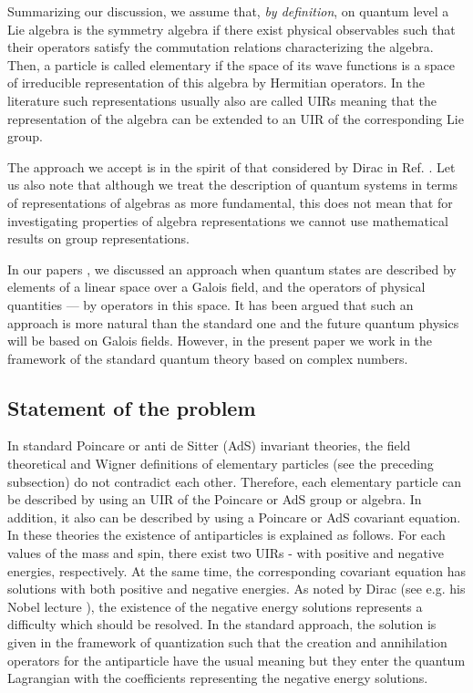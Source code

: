 \documentclass[a4paper,12pt]{article}%
\begin{document}
Summarizing our discussion, we assume that, 
{\it by definition}, on quantum level a Lie algebra is 
the symmetry algebra if there exist physical
observables such that their operators  
satisfy the commutation relations characterizing the
algebra. Then, a particle is called elementary if the 
space of its wave functions is a space of irreducible 
representation of this algebra by Hermitian operators. 
In the literature such representations usually also are 
called UIRs meaning that the representation of the 
algebra can be extended to an UIR of the corresponding 
Lie group. 
 
The approach we accept is in the spirit of that considered 
by Dirac in Ref. \cite{Dir}. Let us also note that 
although we treat the description of quantum systems in 
terms of representations of algebras as more 
fundamental, this does not mean that for investigating 
properties of algebra representations we cannot use
mathematical results on group representations. 

In our papers \cite{lev2}, we discussed an approach when 
quantum  states are described by elements of a linear 
space over a Galois field, and the operators of 
physical quantities --- by operators in this space. 
It has been argued that such an approach is more 
natural than the standard one and the future quantum
physics will be based on Galois fields. However, in 
the present paper we work in the framework of the 
standard quantum theory based on complex numbers.

\subsection{Statement of the problem}

In standard Poincare or anti de Sitter (AdS) invariant
theories, the field theoretical and Wigner definitions
of elementary particles (see the preceding subsection)
do not contradict each other. Therefore, each elementary
particle can be described by using an UIR of the Poincare 
or AdS group or algebra. In addition, it also can be described 
by using a Poincare or AdS covariant 
equation. In these theories the existence of antiparticles
is explained as follows. For each values of the mass 
and spin, there exist two UIRs - with positive and 
negative energies, respectively.
At the same time, the corresponding covariant equation 
has solutions with both positive and negative energies.    
As noted by Dirac (see e.g. his Nobel
lecture \cite{DirNobel}), the existence of the negative
energy solutions represents a difficulty which should be
resolved. In the standard approach, the solution is given
in the framework of quantization such that the
creation and annihilation operators for the antiparticle
have the usual meaning but they enter the quantum Lagrangian 
with the coefficients representing the negative energy
solutions. 
\end{document}

